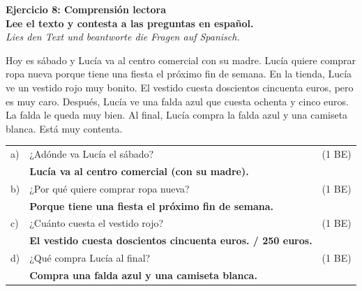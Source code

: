 \documentclass[11pt, a4paper]{article}
\newcommand{\punktebox}[1]{\hfill\fbox{\scriptsize \_\_/#1}}
\newcommand{\lsg}[1]{\textcolor{loesung}{\textbf{#1}}}
\newcommand{\aufgabe}[3]{%
    \textbf{\textcolor{spanisch}{Ejercicio #1: #2}} \punktebox{#3}\\[2pt]
}
\newcommand{\enunciado}[2]{%
    \textbf{#1}\\[1pt]
    {\small\textit{#2}}%
}
\begin{document}
\vspace{10pt}

\newpage


\aufgabe{8}{Comprensión lectora}{4}

\enunciado{Lee el texto y contesta a las preguntas en español.}{Lies den Text und beantworte die Fragen auf Spanisch.}

\vspace{6pt}

\begin{textbox}
\small
Hoy es sábado y Lucía va al centro comercial con su madre. Lucía quiere comprar ropa nueva porque tiene una fiesta el próximo fin de semana. En la tienda, Lucía ve un vestido rojo muy bonito. El vestido cuesta doscientos cincuenta euros, pero es muy caro. Después, Lucía ve una falda azul que cuesta ochenta y cinco euros. La falda le queda muy bien. Al final, Lucía compra la falda azul y una camiseta blanca. Está muy contenta.
\end{textbox}

\vspace{6pt}

\begin{tabular}{@{}p{0.5cm}p{12cm}p{2cm}@{}}
a) & ¿Adónde va Lucía el sábado? & (1 BE) \\[4pt]
& \lsg{Lucía va al centro comercial (con su madre).} & \\[8pt]
b) & ¿Por qué quiere comprar ropa nueva? & (1 BE) \\[4pt]
& \lsg{Porque tiene una fiesta el próximo fin de semana.} & \\[8pt]
c) & ¿Cuánto cuesta el vestido rojo? & (1 BE) \\[4pt]
& \lsg{El vestido cuesta doscientos cincuenta euros. / 250 euros.} & \\[8pt]
d) & ¿Qué compra Lucía al final? & (1 BE) \\[4pt]
& \lsg{Compra una falda azul y una camiseta blanca.} & \\
\end{tabular}

\vspace{10pt}

\end{document}
